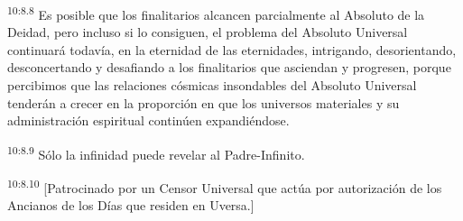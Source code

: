\par
\textsuperscript{10:8.8} Es posible que los finalitarios alcancen parcialmente al Absoluto de la Deidad, pero incluso si lo consiguen, el problema del Absoluto Universal continuará todavía, en la eternidad de las eternidades, intrigando, desorientando, desconcertando y desafiando a los finalitarios que asciendan y progresen, porque percibimos que las relaciones cósmicas insondables del Absoluto Universal tenderán a crecer en la proporción en que los universos materiales y su administración espiritual continúen expandiéndose.

\par
\textsuperscript{10:8.9} Sólo la infinidad puede revelar al Padre-Infinito.

\par
\textsuperscript{10:8.10} [Patrocinado por un Censor Universal que actúa por autorización de los Ancianos de los Días que residen en Uversa.]